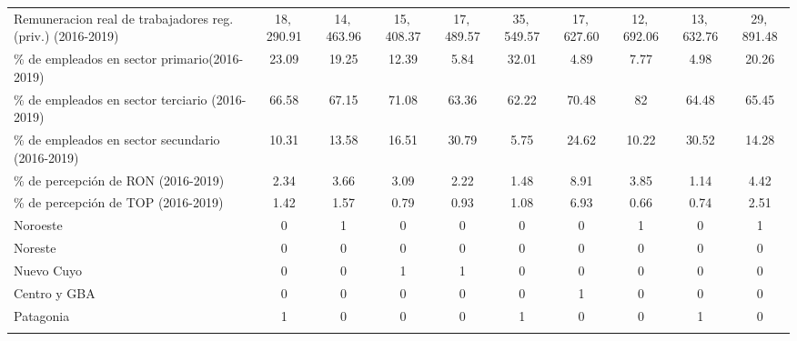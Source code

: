 \documentclass[12pt,a4paper]{article}
\begin{document}
\begin{table}
\begin{tabular}{@{\extracolsep{5pt}} lccccccccc}
Remuneracion  real de trabajadores reg. (priv.) (2016-2019) & 18$,$290.91 & 14$,$463.96 & 15$,$408.37 & 17$,$489.57 & 35$,$549.57 & 17$,$627.60 & 12$,$692.06 & 13$,$632.76 & 29$,$891.48 \\ 
\% de empleados en sector primario(2016-2019) & 23.09 & 19.25 & 12.39 & 5.84 & 32.01 & 4.89 & 7.77 & 4.98 & 20.26 \\ 
\% de empleados en sector terciario (2016-2019) & 66.58 & 67.15 & 71.08 & 63.36 & 62.22 & 70.48 & 82 & 64.48 & 65.45 \\ 
\% de empleados en sector secundario (2016-2019) & 10.31 & 13.58 & 16.51 & 30.79 & 5.75 & 24.62 & 10.22 & 30.52 & 14.28 \\ 
\% de percepción de RON (2016-2019) & 2.34 & 3.66 & 3.09 & 2.22 & 1.48 & 8.91 & 3.85 & 1.14 & 4.42 \\ 
\% de percepción de TOP  (2016-2019) & 1.42 & 1.57 & 0.79 & 0.93 & 1.08 & 6.93 & 0.66 & 0.74 & 2.51 \\ 
Noroeste & 0 & 1 & 0 & 0 & 0 & 0 & 1 & 0 & 1 \\ 
Noreste & 0 & 0 & 0 & 0 & 0 & 0 & 0 & 0 & 0 \\ 
Nuevo Cuyo & 0 & 0 & 1 & 1 & 0 & 0 & 0 & 0 & 0 \\ 
Centro y GBA & 0 & 0 & 0 & 0 & 0 & 1 & 0 & 0 & 0 \\ 
Patagonia & 1 & 0 & 0 & 0 & 1 & 0 & 0 & 1 & 0 \\ 
\hline \\[-1.8ex] 
\end{tabular} 

\end{table} 


\newpage
\nocite{*}
\printbibliography[title={Bibliografía}, heading=bibintoc]
\end{document}
